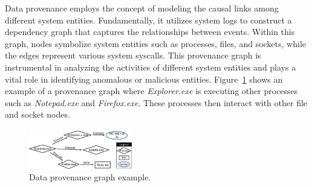 Data provenance employs the concept of modeling the causal links among different system entities. Fundamentally, it utilizes system logs to construct a dependency graph that captures the relationships between events. Within this graph, nodes symbolize system entities such as processes, files, and sockets, while the edges represent various system syscalls. This provenance graph is instrumental in analyzing the activities of different system entities and plays a vital role in identifying anomalous or malicious entities. Figure~\ref{provexp} shows an example of a provenance graph where \textit{Explorer.exe} is executing other processes such as \textit{Notepad.exe} and \textit{Firefox.exe}. These processes then interact with other file and socket nodes.

\begin{figure}[t!]
  \centering
  \includegraphics[width=0.4\textwidth]{fig/provexp.pdf}
  \caption{Data provenance graph example.}

  \label{provexp}
  \vspace{-2ex}
\end{figure}



